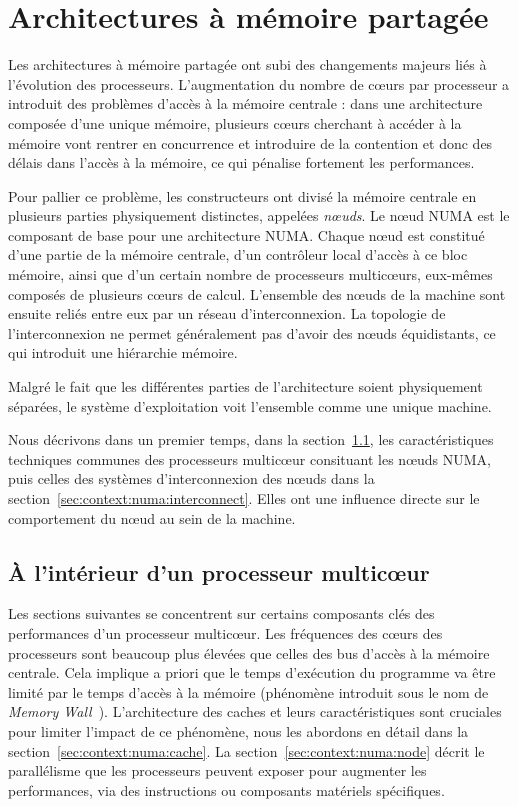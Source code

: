 \section{Architectures à mémoire partagée}\label{sec:context:numa}


Les architectures à mémoire partagée ont subi des changements majeurs liés à l'évolution des processeurs.
L'augmentation du nombre de cœurs par processeur a introduit des problèmes d'accès à la mémoire centrale : dans une architecture composée d'une unique mémoire, plusieurs cœurs cherchant à accéder à la mémoire vont rentrer en concurrence et introduire de la contention et donc des délais dans l'accès à la mémoire, ce qui pénalise fortement les performances.

Pour pallier ce problème, les constructeurs ont divisé la mémoire centrale en plusieurs parties physiquement distinctes, appelées \emph{nœuds}.
Le nœud NUMA est le composant de base pour une architecture NUMA.
Chaque nœud est constitué d'une partie de la mémoire centrale, d'un contrôleur local d'accès à ce bloc mémoire, ainsi que d'un certain nombre de processeurs multicœurs, eux-mêmes composés de plusieurs cœurs de calcul.
L'ensemble des nœuds de la machine sont ensuite reliés entre eux par un réseau d'interconnexion.
La topologie de l'interconnexion ne permet généralement pas d'avoir des nœuds équidistants, ce qui introduit une hiérarchie mémoire.

Malgré le fait que les différentes parties de l'architecture soient physiquement séparées, le système d'exploitation voit l'ensemble comme une unique machine.

Nous décrivons dans un premier temps, dans la section~\ref{sec:context:numa:multicore}, les caractéristiques techniques communes des processeurs multicœur consituant les nœuds NUMA, puis celles des systèmes d'interconnexion des nœuds dans la section~\ref{sec:context:numa:interconnect}.
Elles ont une influence directe sur le comportement du nœud au sein de la machine.

\subsection{À l'intérieur d'un processeur multicœur}\label{sec:context:numa:multicore}

Les sections suivantes se concentrent sur certains composants clés des performances d'un processeur multicœur.
Les fréquences des cœurs des processeurs sont beaucoup plus élevées que celles des bus d'accès à la mémoire centrale.
Cela implique a priori que le temps d'exécution du programme va être limité par le temps d'accès à la mémoire (phénomène introduit sous le nom de \emph{Memory Wall}~\cite{Wulf1995}).
L'architecture des caches et leurs caractéristiques sont cruciales pour limiter l'impact de ce phénomène, nous les abordons en détail dans la section~\ref{sec:context:numa:cache}.
La section~\ref{sec:context:numa:node} décrit le parallélisme que les processeurs peuvent exposer pour augmenter les performances, via des instructions ou composants matériels spécifiques.



